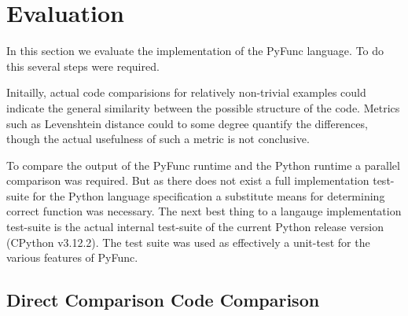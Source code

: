 \documentclass{l4proj}
\begin{document}




\chapter{Evaluation} 

In this section we evaluate the implementation of the PyFunc language.
To do this several steps were required.

Initailly, actual code comparisions for relatively non-trivial examples could indicate the general similarity between the possible structure of the code.
Metrics such as Levenshtein distance could to some degree quantify the differences, though the actual usefulness of such a metric is not conclusive.

To compare the output of the PyFunc runtime and the Python runtime a parallel comparison was required.
But as there does not exist a full implementation test-suite for the Python language specification a substitute means for determining correct function was necessary.
The next best thing to a langauge implementation test-suite is the actual internal test-suite of the current Python release version (CPython v3.12.2).
The test suite was used as effectively a unit-test for the various features of PyFunc.

\section{Direct Comparison Code Comparison}

\end{document}
